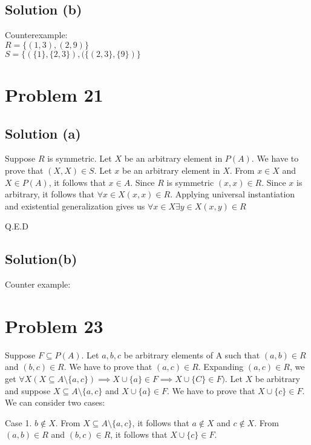 \documentclass{article}
\begin{document}
\subsection{Solution (b)}

Counterexample: \\
$R = \{(1,3), (2,9)\}$ \\
$S = \{(\{1\},\{2,3\}), (\{(2,3\}, \{9\})\}$ 

\section{Problem 21}

\subsection{Solution (a)}

Suppose $R$ is symmetric. Let $X$ be an arbitrary element in $P(A)$.
We have to prove that $(X,X) \in S$. Let $x$ be an arbitrary element
in $X$. From $x \in X$ and $X \in P(A)$, it follows that $x \in A$.
Since $R$ is symmetric $(x,x) \in R$. Since $x$ is arbitrary, it
follows that $\forall x \in X (x,x) \in R$. Applying universal
instantiation and existential generalization gives us $\forall x \in X
\exists y \in X(x,y) \in R$

Q.E.D

\subsection{Solution(b)}

Counter example: 



\section{Problem 23}
Suppose $F \subseteq P(A)$. Let $a,b,c$ be arbitrary elements of A
such that $(a,b) \in R$ and $(b,c) \in R$. We have to prove that
$(a,c) \in R$. Expanding $(a,c) \in R$, we get $\forall X(X \subseteq
A \setminus \{a,c\}) \implies X \cup \{a\} \in F \implies X \cup \{C\}
\in F)$. Let $X$ be arbitrary and suppose $X \subseteq A \setminus
\{a,c\}$ and $X \cup \{a\} \in F$. We have to prove that $X \cup \{c\}
\in F$. We can consider two cases:

Case 1. $b \notin X$. From $X \subseteq A \setminus \{a,c\}$, it
follows that $a \notin X$ and $c \notin X$. From $(a,b) \in R$ and
$(b,c) \in R$, it follows that $X \cup \{c\} \in F$.
\end{document}

